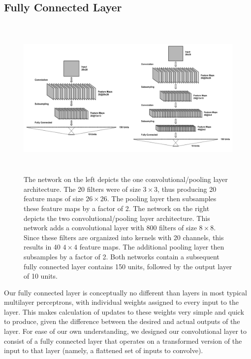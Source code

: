 \documentclass[10pt,twocolumn,letterpaper]{article}
\begin{document}
\subsection{Fully Connected Layer}
\label{sec:full}

\begin{figure}
  \includegraphics[width=\textwidth,height=8cm]{botharcs}
  \caption{The network on the left depicts the one convolutional/pooling layer architecture. The 20
  filters were of size $3 \times 3$, thus producing 20 feature maps of size $26 \times 26$. The pooling layer
  then subsamples these feature maps by a factor of 2. The network on the right depicts the two convolutional/pooling layer
  architecture. This network adds a convolutional layer with 800 filters of size $8 \times 8$. Since these filters
  are organized into kernels with 20 channels, this results in 40 $4 \times 4$ feature maps. The additional pooling
  layer then subsamples by a factor of 2. Both networks contain a subsequent fully connected layer contains 150 units,
  followed by the output layer of 10 units.}
  \label{fig:convarcs}
\end{figure}

Our fully connected layer is conceptually no different than layers in most typical multilayer
perceptrons, with individual weights assigned to every input to the layer.
This makes calculation of updates to these weights very simple and quick to produce, given the
difference between the desired and actual outputs of the layer.
For ease of our own understanding, we designed our convolutional layer to consist of a
fully connected layer that operates on a transformed version of the input to that layer
(namely, a flattened set of inputs to convolve).
\end{document}
